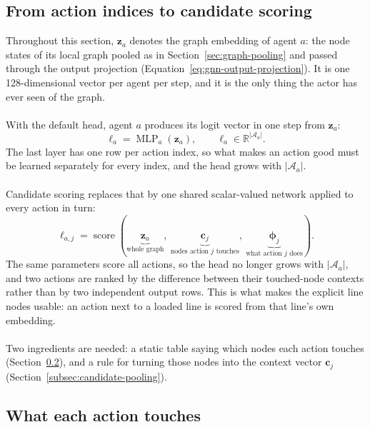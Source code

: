 \subsection{From action indices to candidate scoring}
\label{subsec:candidate-motivation}

Throughout this section, $\mathbf{z}_a$ denotes the graph embedding of agent
$a$: the node states of its local graph pooled as in
Section~\ref{sec:graph-pooling} and passed through the output projection
(Equation~\ref{eq:gnn-output-projection}). It is one 128-dimensional vector per
agent per step, and it is the only thing the actor has ever seen of the graph.
\\
\\
With the default head, agent $a$ produces its logit vector in one step from
$\mathbf{z}_a$:
\begin{equation}
  \boldsymbol{\ell}_a = \operatorname{MLP}_a(\mathbf{z}_a),
  \qquad \boldsymbol{\ell}_a\in\mathbb{R}^{|\mathcal{A}_a|}.
  \label{eq:action-index-head}
\end{equation}
The last layer has one row per action index, so what makes an action good must
be learned separately for every index, and the head grows with
$|\mathcal{A}_a|$.
\\
\\
Candidate scoring replaces that by one shared scalar-valued network applied to
every action in turn:
\begin{equation}
  \ell_{a,j} =
  \operatorname{score}
  \left(
    \underbrace{\mathbf{z}_a}_{\text{whole graph}},\
    \underbrace{\mathbf{c}_j}_{\text{nodes action }j\text{ touches}},\
    \underbrace{\boldsymbol{\phi}_j}_{\text{what action }j\text{ does}}
  \right).
  \label{eq:candidate-scoring-head}
\end{equation}
The same parameters score all actions, so the head no longer grows with
$|\mathcal{A}_a|$, and two actions are ranked by the difference between their
touched-node contexts rather than by two independent output rows. This is what
makes the explicit line nodes usable: an action next to a loaded line is scored
from that line's own embedding.
\\
\\
Two ingredients are needed: a static table saying which nodes each action
touches (Section~\ref{subsec:candidate-action-metadata}), and a rule for
turning those nodes into the context vector $\mathbf{c}_j$
(Section~\ref{subsec:candidate-pooling}).

\subsection{What each action touches}
\label{subsec:candidate-action-metadata}

